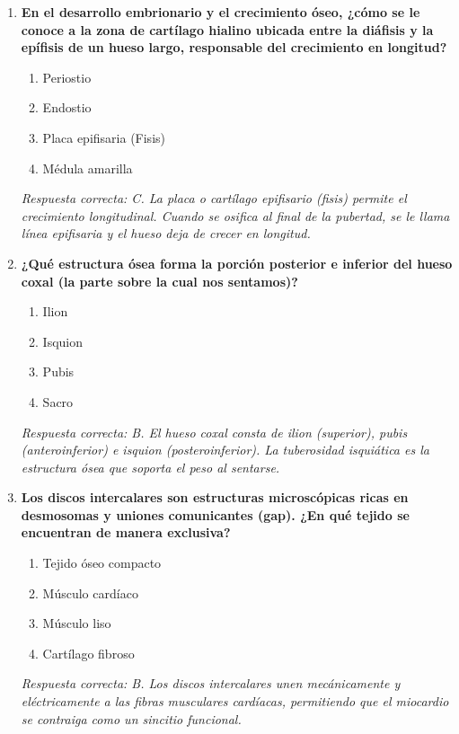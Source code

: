 \begin{enumerate}[label=\textbf{\arabic*.}]
    \item \textbf{En el desarrollo embrionario y el crecimiento óseo, ¿cómo se le conoce a la zona de cartílago hialino ubicada entre la diáfisis y la epífisis de un hueso largo, responsable del crecimiento en longitud?}
    \begin{enumerate}
        \item[A)] Periostio
        \item[B)] Endostio
        \item[C)] Placa epifisaria (Fisis)
        \item[D)] Médula amarilla
    \end{enumerate}
    \textit{Respuesta correcta: C. La placa o cartílago epifisario (fisis) permite el crecimiento longitudinal. Cuando se osifica al final de la pubertad, se le llama línea epifisaria y el hueso deja de crecer en longitud.}

    \item \textbf{¿Qué estructura ósea forma la porción posterior e inferior del hueso coxal (la parte sobre la cual nos sentamos)?}
    \begin{enumerate}
        \item[A)] Ilion
        \item[B)] Isquion
        \item[C)] Pubis
        \item[D)] Sacro
    \end{enumerate}
    \textit{Respuesta correcta: B. El hueso coxal consta de ilion (superior), pubis (anteroinferior) e isquion (posteroinferior). La tuberosidad isquiática es la estructura ósea que soporta el peso al sentarse.}

    \item \textbf{Los discos intercalares son estructuras microscópicas ricas en desmosomas y uniones comunicantes (gap). ¿En qué tejido se encuentran de manera exclusiva?}
    \begin{enumerate}
        \item[A)] Tejido óseo compacto
        \item[B)] Músculo cardíaco
        \item[C)] Músculo liso
        \item[D)] Cartílago fibroso
    \end{enumerate}
    \textit{Respuesta correcta: B. Los discos intercalares unen mecánicamente y eléctricamente a las fibras musculares cardíacas, permitiendo que el miocardio se contraiga como un sincitio funcional.}


\end{enumerate}
